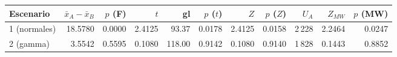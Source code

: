 \begin{tabular}{lrrrrrrrrrr}
\toprule
\textbf{Escenario} & \textbf{$\bar x_A-\bar x_B$} & \textbf{$p$ (F)} & \textbf{$t$} & \textbf{gl} & \textbf{$p$ ($t$)} & \textbf{$Z$} & \textbf{$p$ ($Z$)} & \textbf{$U_A$} & \textbf{$Z_{MW}$} & \textbf{$p$ (MW)} \\ \midrule
1 (normales) & 18.5780 & 0.0000 & 2.4125 & 93.37 & 0.0178 & 2.4125 & 0.0158 & 2\,228 & 2.2464 & 0.0247 \\
2 (gamma) & 3.5542 & 0.5595 & 0.1080 & 118.00 & 0.9142 & 0.1080 & 0.9140 & 1\,828 & 0.1443 & 0.8852 \\
\bottomrule
\end{tabular}